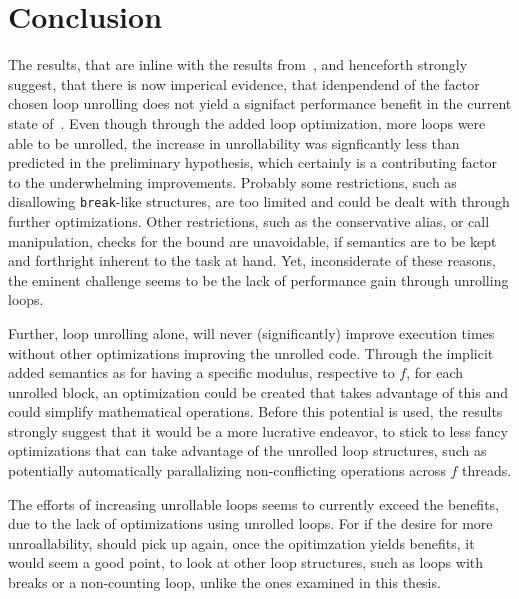 \chapter{Conclusion}\label{sec:conclusion}

The results, that are inline with the results from~\cite{aebi18bachelorarbeit}, and henceforth strongly suggest, that there is now imperical evidence, that idenpendend of the factor chosen loop unrolling does not yield a signifact performance benefit in the current state of~\libFIRM.
Even though through the added loop optimization, more loops were able to be unrolled, the increase in unrollability was signficantly less than predicted in the preliminary hypothesis, which certainly is a contributing factor to the underwhelming improvements.
Probably some restrictions, such as disallowing \texttt{break}-like structures, are too limited and could be dealt with through further optimizations.
Other restrictions, such as the conservative alias, or call manipulation, checks for the bound are unavoidable, if semantics are to be kept and forthright inherent to the task at hand.
Yet, inconsiderate of these reasons, the eminent challenge seems to be the lack of performance gain through unrolling loops.

Further, loop unrolling alone, will never (significantly) improve execution times without other optimizations improving the unrolled code.
Through the implicit added semantics as for having a specific modulus, respective to $f$, for each unrolled block, an optimization could be created that takes advantage of this and could simplify mathematical operations.
Before this potential is used, the results strongly suggest that it would be a more lucrative endeavor, to stick to less fancy optimizations that can take advantage of the unrolled loop structures, such as potentially automatically parallalizing non-conflicting operations across $f$ threads. %

The efforts of increasing unrollable loops seems to currently exceed the benefits, due to the lack of optimizations using unrolled loops.
For if the desire for more unroallability, should pick up again, once the opitimzation yields benefits, it would seem a good point, to look at other loop structures, such as loops with breaks or a non-counting loop, unlike the ones examined in this thesis.
